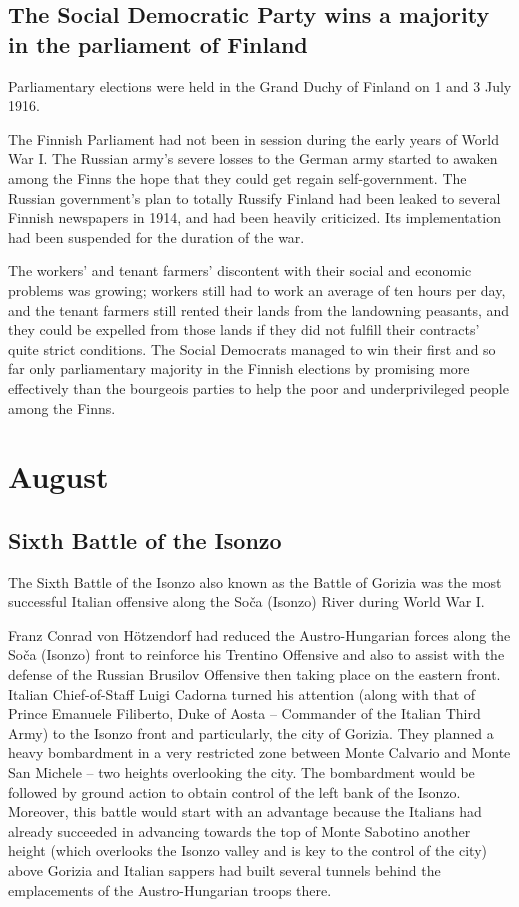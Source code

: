 \documentclass[a4paper,]{book}
\begin{document}
\section{The Social Democratic Party wins a majority in the parliament of Finland}

Parliamentary elections were held in the Grand Duchy of Finland on 1 and 3 July 1916. 

The Finnish Parliament had not been in session during the early years of World War I. The Russian army's severe losses to the German army started to awaken among the Finns the hope that they could get regain self-government. The Russian government's plan to totally Russify Finland had been leaked to several Finnish newspapers in 1914, and had been heavily criticized. Its implementation had been suspended for the duration of the war. 

The workers' and tenant farmers' discontent with their social and economic problems was growing; workers still had to work an average of ten hours per day, and the tenant farmers still rented their lands from the landowning peasants, and they could be expelled from those lands if they did not fulfill their contracts' quite strict conditions. The Social Democrats managed to win their first and so far only parliamentary majority in the Finnish elections by promising more effectively than the bourgeois parties to help the poor and underprivileged people among the Finns.



\chapter{August}

\section{Sixth Battle of the Isonzo}

The Sixth Battle of the Isonzo also known as the Battle of Gorizia was the most successful Italian offensive along the Soča (Isonzo) River during World War I. 

Franz Conrad von Hötzendorf had reduced the Austro-Hungarian forces along the Soča (Isonzo) front to reinforce his Trentino Offensive and also to assist with the defense of the Russian Brusilov Offensive then taking place on the eastern front. Italian Chief-of-Staff Luigi Cadorna turned his attention (along with that of Prince Emanuele Filiberto, Duke of Aosta – Commander of the Italian Third Army) to the Isonzo front and particularly, the city of Gorizia. They planned a heavy bombardment in a very restricted zone between Monte Calvario and Monte San Michele – two heights overlooking the city. The bombardment would be followed by ground action to obtain control of the left bank of the Isonzo. Moreover, this battle would start with an advantage because the Italians had already succeeded in advancing towards the top of Monte Sabotino another height (which overlooks the Isonzo valley and is key to the control of the city) above Gorizia and Italian sappers had built several tunnels behind the emplacements of the Austro-Hungarian troops there.
\end{document}
